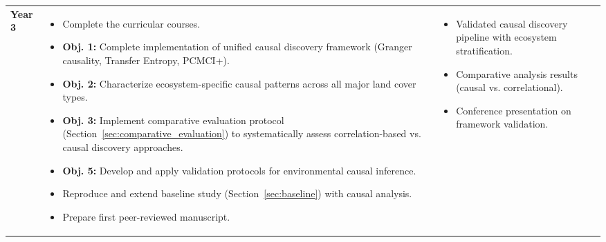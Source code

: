 \begin{longtable}{@{} >{\centering\arraybackslash}p{1.5cm} >{\centering\arraybackslash}p{7.5cm} >{\centering\arraybackslash}p{4.5cm} @{}}
	\addlinespace[0.8em]
	\textbf{Year 3}                      &
	\begin{minipage}[t]{8cm}\raggedright
		\begin{itemize}[left=0pt, labelsep=4pt, itemsep=2pt]
			\item Complete the curricular courses.
			\item \textbf{Obj. 1:} Complete implementation of unified causal discovery framework (Granger causality, Transfer Entropy, PCMCI+).
			\item \textbf{Obj. 2:} Characterize ecosystem-specific causal patterns across all major land cover types.
			\item \textbf{Obj. 3:} Implement comparative evaluation protocol (Section~\ref{sec:comparative_evaluation}) to systematically assess correlation-based vs. causal discovery approaches.
			\item \textbf{Obj. 5:} Develop and apply validation protocols for environmental causal inference.
			\item Reproduce and extend baseline study (Section~\ref{sec:baseline}) with causal analysis.
			\item Prepare first peer-reviewed manuscript.
		\end{itemize}
	\end{minipage} &
	\begin{minipage}[t]{3cm}\raggedright
		\begin{itemize}[left=0pt, labelsep=4pt, itemsep=2pt]
			\item Validated causal discovery pipeline with ecosystem stratification.
			\item Comparative analysis results (causal vs. correlational).
			\item Conference presentation on framework validation.
		\end{itemize}
	\end{minipage}                                                               \\


\end{longtable}
